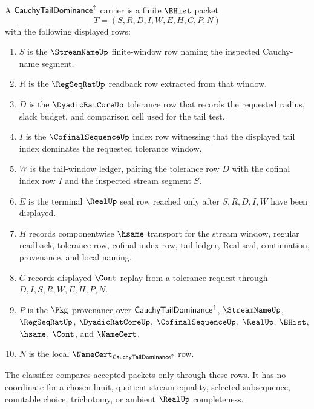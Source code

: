 \begin{definition}
\label{def:cauchy-tail-dominance-carrier}
A $\mathsf{CauchyTailDominance}^{\uparrow}$ carrier is a finite $\BHist$ packet
$$
T=(S,R,D,I,W,E,H,C,P,N)
$$
with the following displayed rows:
\begin{enumerate}
\item $S$ is the $\StreamNameUp$ finite-window row naming the inspected Cauchy-name segment.
\item $R$ is the $\RegSeqRatUp$ readback row extracted from that window.
\item $D$ is the $\DyadicRatCoreUp$ tolerance row that records the requested radius, slack budget, and comparison cell used for the tail test.
\item $I$ is the $\CofinalSequenceUp$ index row witnessing that the displayed tail index dominates the requested tolerance window.
\item $W$ is the tail-window ledger, pairing the tolerance row $D$ with the cofinal index row $I$ and the inspected stream segment $S$.
\item $E$ is the terminal $\RealUp$ seal row reached only after $S,R,D,I,W$ have been displayed.
\item $H$ records componentwise $\hsame$ transport for the stream window, regular readback, tolerance row, cofinal index row, tail ledger, Real seal, continuation, provenance, and local naming.
\item $C$ records displayed $\Cont$ replay from a tolerance request through $D,I,S,R,W,E,H,P,N$.
\item $P$ is the $\Pkg$ provenance over $\mathsf{CauchyTailDominance}^{\uparrow}$, $\StreamNameUp$, $\RegSeqRatUp$, $\DyadicRatCoreUp$, $\CofinalSequenceUp$, $\RealUp$, $\BHist$, $\hsame$, $\Cont$, and $\NameCert$.
\item $N$ is the local $\NameCert_{\CauchyTailDominanceUp}$ row.
\end{enumerate}
The classifier compares accepted packets only through these rows. It has no coordinate for a chosen limit, quotient stream equality, selected subsequence, countable choice, trichotomy, or ambient $\RealUp$ completeness.
\end{definition}

